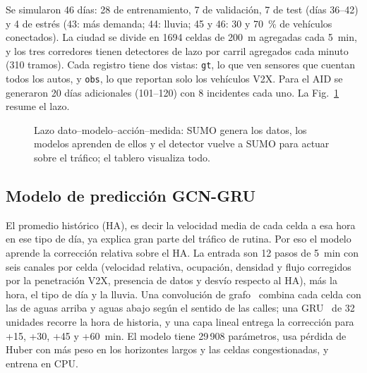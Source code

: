 \documentclass[conference,a4paper]{IEEEtran}
\begin{document}
Se simularon 46 días: 28 de entrenamiento, 7 de validación, 7 de test (días 36--42) y 4 de estrés (43: más demanda; 44: lluvia; 45 y 46: 30 y 70~\% de vehículos conectados). La ciudad se divide en 1694 celdas de 200~m agregadas cada 5~min, y los tres corredores tienen detectores de lazo por carril agregados cada minuto (310 tramos). Cada registro tiene dos vistas: \texttt{gt}, lo que ven sensores que cuentan todos los autos, y \texttt{obs}, lo que reportan solo los vehículos V2X. Para el AID se generaron 20 días adicionales (101--120) con 8 incidentes cada uno. La Fig.~\ref{fig:flujo} resume el lazo.

\begin{figure}[t]
\centering
{}
\caption{Lazo dato--modelo--acción--medida: SUMO genera los datos, los modelos aprenden de ellos y el detector vuelve a SUMO para actuar sobre el tráfico; el tablero visualiza todo.}
\label{fig:flujo}
\end{figure}

\subsection{Modelo de predicción GCN-GRU}
El promedio histórico (HA), es decir la velocidad media de cada celda a esa hora en ese tipo de día, ya explica gran parte del tráfico de rutina. Por eso el modelo aprende la corrección relativa sobre el HA. La entrada son 12 pasos de 5~min con seis canales por celda (velocidad relativa, ocupación, densidad y flujo corregidos por la penetración V2X, presencia de datos y desvío respecto al HA), más la hora, el tipo de día y la lluvia. Una convolución de grafo~\cite{gcn} combina cada celda con las de aguas arriba y aguas abajo según el sentido de las calles; una GRU~\cite{gru} de 32 unidades recorre la hora de historia, y una capa lineal entrega la corrección para +15, +30, +45 y +60~min. El modelo tiene 29\,908 parámetros, usa pérdida de Huber con más peso en los horizontes largos y las celdas congestionadas, y entrena en CPU.
\end{document}

